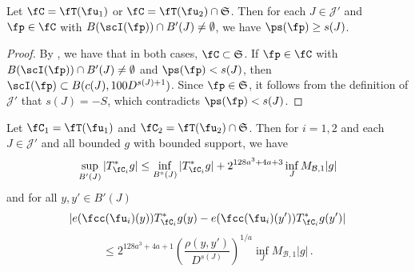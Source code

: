     \begin{lemma}
        \label{scales-impacting-interval}
        \leanok
        Let $\fC = \fT(\fu_1)$ or $\fC = \fT(\fu_2) \cap \mathfrak{S}$. Then for each $J \in \mathcal{J}'$ and $\fp \in \fC$ with $B(\scI(\fp)) \cap B'(J) \neq \emptyset$, we have $\ps(\fp) \ge s(J)$.
    \end{lemma}

    \begin{proof}
        \leanok
        By , we have that in both cases, $\fC \subset \mathfrak{S}$. If $\fp \in \fC$ with $B(\scI(\fp)) \cap B'(J) \neq \emptyset$ and $\ps(\fp) < s(J)$, then $\scI(\fp) \subset B(c(J), 100 D^{s(J) + 1})$. Since $\fp \in \mathfrak{S}$, it follows from the definition of $\mathcal{J}'$ that $s(J) = -S$, which contradicts $\ps(\fp) < s(J)$.
    \end{proof}

    \begin{lemma}
        \label{global-tree-control-1}
        \leanok
        Let $\fC_1 = \fT(\fu_1)$ and $\fC_2 = \fT(\fu_2) \cap \mathfrak{S}$. Then for $i = 1,2$ and each $J \in \mathcal{J}'$ and all bounded $g$ with bounded support, we have
        \begin{align}
            \label{TreeUB}
            \sup_{B'(J)} |T_{\fC_i}^*g| \leq \inf_{B^\circ{}(J)} |T^*_{\fC_i} g| + 2^{128a^3+4a+3} \inf_{J} M_{\mathcal{B}, 1} |g|
        \end{align}
        and for all $y,y' \in B'(J)$
        $$
            |e(\fcc(\fu_i)(y)) T_{\fC_i}^* g(y) - e(\fcc(\fu_i)(y')) T_{\fC_i}^* g(y')|
        $$
        \begin{equation}
            \label{TreeHolder}
             \le 2^{128a^3+4a+1} \left(\frac{\rho(y,y')}{D^{s(J)}}\right)^{1/a} \inf_J M_{\mathcal{B},1} |g|\,.
        \end{equation}
    \end{lemma}

